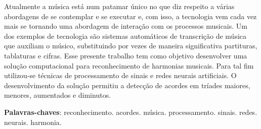\begin{resumo}
 Atualmente a música está num patamar único no que diz respeito a várias abordagens de se contemplar e se executar e, com isso, a tecnologia vem cada vez mais se tornando uma abordagem de interação com os processos musicais. Um dos exemplos de tecnologia são sistemas automáticos de transcrição de música que auxiliam o músico, substituindo por vezes de maneira significativa partituras, tablaturas e cifras. Esse presente trabalho tem como objetivo desenvolver uma solução computacional para reconhecimento de harmonias musicais. Para tal fim utilizou-se técnicas de processamento de sinais e redes neurais artificiais. O desenvolvimento da solução permitiu a detecção de acordes em tríades maiores, menores, aumentados e diminutos.

 \vspace{\onelineskip}

 \noindent
 \textbf{Palavras-chaves}: reconhecimento. acordes. música. processamento. sinais. redes. neurais. harmonia.
\end{resumo}
